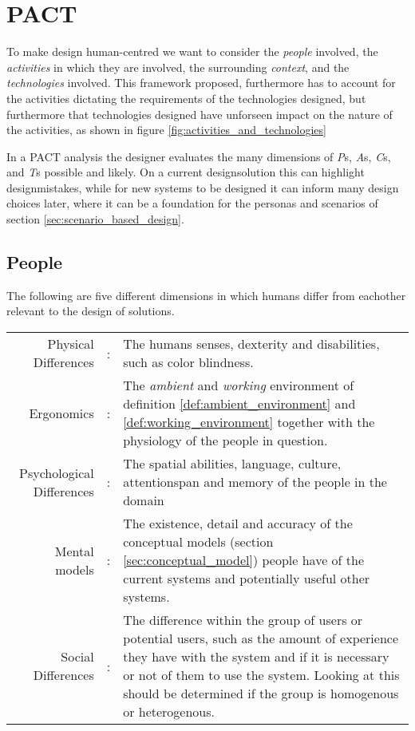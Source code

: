 \section{PACT} \label{sec:pact} 

To make design human-centred we want to consider the \emph{people} involved, the \emph{activities} in which they are involved, the surrounding \emph{context}, and the \emph{technologies} involved. This framework proposed, furthermore has to account for the activities dictating the requirements of the technologies designed, but furthermore that technologies designed have unforseen impact on the nature of the activities, as shown in figure \ref{fig:activities_and_technologies} \cite[p. 25-26]{benyon14}

In a PACT analysis the designer evaluates the many dimensions of \emph{P}s, \emph{A}s, \emph{C}s, and \emph{T}s possible and likely. On a current designsolution this can highlight designmistakes, while for new systems to be designed it can inform many design choices later, where it can be a foundation for the personas and scenarios of section \ref{sec:scenario_based_design}.

\subsection{People}
The following are five different dimensions in which humans differ from eachother relevant to the design of solutions. \cite[p. 27-30]{benyon14}

\noindent
\begin{longtable}{rc>{\raggedright\arraybackslash}p{}}
  Physical Differences & : &
  The humans senses, dexterity and disabilities, such as color blindness.
  \\
  Ergonomics & : &
  The \emph{ambient} and \emph{working} environment of definition \ref{def:ambient_environment} and \ref{def:working_environment} together with the physiology of the people in question.
  \\
  Psychological Differences & : &
  The spatial abilities, language, culture, attentionspan and memory of the people in the domain
  \\
  Mental models & : &
  The existence, detail and accuracy of the conceptual models (section \ref{sec:conceptual_model}) people have of the current systems and potentially useful other systems.
  \\
  Social Differences & : &
  The difference within the group of users or potential users, such as the amount of experience they have with the system and if it is necessary or not of them to use the system. Looking at this should be determined if the group is homogenous or heterogenous. 
\end{longtable}

